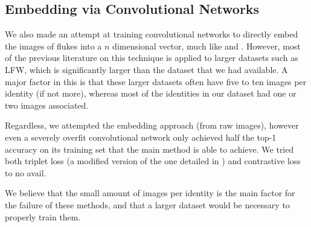 \subsection{Embedding via Convolutional Networks}

We also made an attempt at training convolutional networks to directly embed the images of flukes into a $n$ dimensional vector, much like \cite{schroff2015facenet} and \cite{parkhi2015deep}.
However, most of the previous literature on this technique is applied to larger datasets such as LFW\cite{huang2007labeled}, which is significantly larger than the dataset that we had available.
A major factor in this is that these larger datasets often have five to ten images per identity (if not more), whereas most of the identities in our dataset had one or two images associated.

Regardless, we attempted the embedding approach (from raw images), however even a severely overfit convolutional network only achieved half the top-1 accuracy on its training set that the main method is able to achieve.
We tried both triplet loss (a modified version of the one detailed in \cite{schroff2015facenet}) and contrastive loss \cite{hadsell2006dimensionality} to no avail.

We believe that the small amount of images per identity is the main factor for the failure of these methods, and that a larger dataset would be necessary to properly train them.

